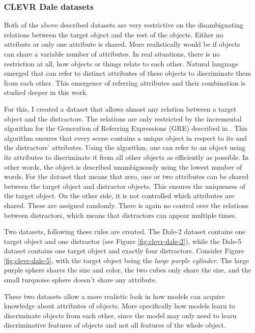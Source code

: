 \subsubsection*{CLEVR Dale datasets}
Both of the above described datasets are very restrictive on the disambiguating relations between the target object and the rest of the objects.
Either no attribute or only one attribute is shared.
More realistically would be if objects can share a variable number of attributes.
In real situations, there is no restriction at all, how objects or things relate to each other.
Natural language emerged that can refer to distinct attributes of these objects to discriminate them from each other.
This emergence of referring attributes and their combination is studied deeper in this work.

For this, I created a dataset that allows almost any relation between a target object and the distractors.
The relations are only restricted by the incremental algorithm for the Generation of Referring Expressions (GRE) described in \citet{Dale1995}.
This algorithm ensures that every scene contains a unique object in respect to its and the distractors' attributes.
Using the algorithm, one can refer to an object using its attributes to discriminate it from all other objects as efficiently as possible.
In other words, the object is described unambiguously using the lowest number of words.
For the dataset that means that zero, one or two attributes can be shared between the target object and distractor objects.
This ensures the uniqueness of the target object.
On the other side, it is not controlled which attributes are shared.
These are assigned randomly.
There is again no control over the relations between distractors, which means that distractors can appear multiple times.

Two datasets, following these rules are created.
The Dale-2 dataset contains one target object and one distractor (see Figure \ref{fig:clevr-dale-2}), while the Dale-5 dataset contains one target object and exactly four distractors.
Consider Figure \ref{fig:clevr-dale-5}, with the target object being the \emph{large purple cylinder}. The large purple sphere shares the size and color, the two cubes only share the size, and the small turquoise sphere doesn't share any attribute.

These two datasets allow a more realistic look in how models can acquire knowledge about attributes of objects.
More specifically how models learn to discriminate objects from each other, since the model may only need to learn discriminative features of objects and not all features of the whole object.


